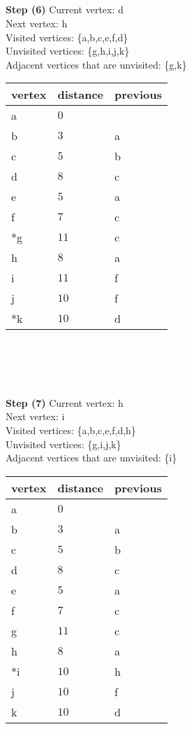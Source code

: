 \documentclass[11pt]{article}
\begin{document}
\\ \\
\\ \\
\textbf{Step (6)} Current vertex: d\\
Next vertex: h\\
Visited vertices: \{a,b,c,e,f,d\}\\
Unvisited vertices: \{g,h,i,j,k\}\\
Adjacent vertices that are unvisited: \{g,k\}\\
\begin{tabular}{|l|l|l|}
    \hline
    vertex & distance & previous \\
    \hline
    a & $0$ &  \\
    \hline
    b & $3$ & a \\
    \hline
    c & $5$ & b \\
    \hline
    d & $8$ & c \\
    \hline
    e & $5$ & a \\
    \hline
    f & $7$ & c \\
    \hline
    *g & $11$ & c \\
    \hline
    h & $8$ & a \\
    \hline
    i & $11$ & f \\
    \hline
    j & $10$ & f \\
    \hline
    *k & $10$ & d \\
    \hline
\end{tabular}
\\ \\
\\ \\
\textbf{Step (7)} Current vertex: h\\
Next vertex: i\\
Visited vertices: \{a,b,c,e,f,d,h\}\\
Unvisited vertices: \{g,i,j,k\}\\
Adjacent vertices that are unvisited: \{i\}\\
\begin{tabular}{|l|l|l|}
    \hline
    vertex & distance & previous \\
    \hline
    a & $0$ &  \\
    \hline
    b & $3$ & a \\
    \hline
    c & $5$ & b \\
    \hline
    d & $8$ & c \\
    \hline
    e & $5$ & a \\
    \hline
    f & $7$ & c \\
    \hline
    g & $11$ & c \\
    \hline
    h & $8$ & a \\
    \hline
    *i & $10$ & h \\
    \hline
    j & $10$ & f \\
    \hline
    k & $10$ & d \\
    \hline
\end{tabular}
\end{document}

